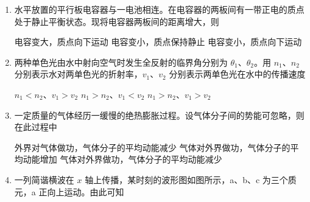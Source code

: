 \documentclass[\gkver]{gaokaozhenti}
\begin{document}
\begin{enumerate}
\item
水平放置的平行板电容器与一电池相连。在电容器的两板间有一带正电的质点处于静止平衡状态。现将电容器两板间的距离增大，则

{电容变大，质点向下运动}
{电容变小，质点保持静止}
{电容变小，质点向下运动}


\item
两种单色光由水中射向空气时发生全反射的临界角分别为 $\theta_{1}$、$\theta_{2}$。用 $n_{1}$、$n_{2}$ 分别表示水对两单色光的折射率，$v_{1}$、$v_{2}$ 分别表示两单色光在水中的传播速度

{$n_{1}<n_{2}$、$v_{1}>v_{2}$}
{$n_{1}>n_{2}$、$v_{1}<v_{2}$}
{$n_{1}>n_{2}$、$v_{1}>v_{2}$}


\item
一定质量的气体经历一缓慢的绝热膨胀过程。设气体分子间的势能可忽略，则在此过程中

{外界对气体做功，气体分子的平均动能减少}
{气体对外界做功，气体分子的平均动能增加}
{气体对外界做功，气体分子的平均动能减少}


\item
一列简谐横波在 $x$ 轴上传播，某时刻的波形图如图所示，a、b、c 为三个质元，a 正向上运动。由此可知



\end{enumerate}
\end{document}
